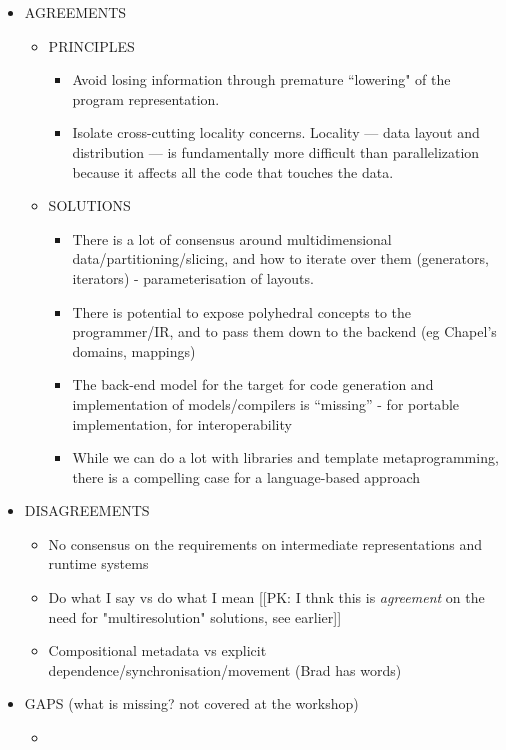 \begin{itemize}
\item AGREEMENTS
  \begin{itemize}
  \item PRINCIPLES
     \begin{itemize}
     \item Avoid losing information through premature ``lowering" of the program representation.
     \item Isolate cross-cutting locality concerns.  Locality --- data layout and distribution --- is fundamentally more difficult than parallelization because it affects all the code that touches the data.   
  \end{itemize}
  \item SOLUTIONS
     \begin{itemize}
     \item There is a lot of consensus around multidimensional data/partitioning/slicing, and how to iterate over them (generators, iterators) - parameterisation of layouts.
     \item There is potential to expose polyhedral concepts to the programmer/IR, and to pass them down to the backend (eg Chapel’s domains, mappings)
     \item The back-end model for the target for code generation and implementation of models/compilers is “missing” - for portable implementation, for interoperability
    \item While we can do a lot with libraries and template metaprogramming, there is a compelling case for a language-based approach
     \end{itemize}
  \end{itemize}

\item  DISAGREEMENTS
  \begin{itemize}
   \item No consensus on the requirements on intermediate representations and runtime systems
   \item Do what I say vs do what I mean [[PK: I thnk this is \emph{agreement} on the need for "multiresolution" solutions, see earlier]]
   \item Compositional metadata vs explicit dependence/synchronisation/movement (Brad has words)
  \end{itemize}


\item GAPS (what is missing? not covered at the workshop)
  \begin{itemize}
   \item
 \end{itemize}


\end{itemize}
